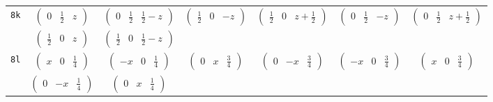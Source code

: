 \documentclass[fleqn,9pt,landscape]{jsarticle}
\begin{document}
\begin{center}
\begin{longtable}{ccccccc}
{\tt 8k} & $ \begin{pmatrix} 0 & \frac{1}{2} & z \end{pmatrix} $ & $ \begin{pmatrix} 0 & \frac{1}{2} & \frac{1}{2} - z \end{pmatrix} $ & $ \begin{pmatrix} \frac{1}{2} & 0 & - z \end{pmatrix} $ & $ \begin{pmatrix} \frac{1}{2} & 0 & z + \frac{1}{2} \end{pmatrix} $ & $ \begin{pmatrix} 0 & \frac{1}{2} & - z \end{pmatrix} $ & $ \begin{pmatrix} 0 & \frac{1}{2} & z + \frac{1}{2} \end{pmatrix} $ \\
& $ \begin{pmatrix} \frac{1}{2} & 0 & z \end{pmatrix} $ & $ \begin{pmatrix} \frac{1}{2} & 0 & \frac{1}{2} - z \end{pmatrix} $ & $  $ & $  $ & $  $ & $  $ \\ \hline
{\tt 8l} & $ \begin{pmatrix} x & 0 & \frac{1}{4} \end{pmatrix} $ & $ \begin{pmatrix} - x & 0 & \frac{1}{4} \end{pmatrix} $ & $ \begin{pmatrix} 0 & x & \frac{3}{4} \end{pmatrix} $ & $ \begin{pmatrix} 0 & - x & \frac{3}{4} \end{pmatrix} $ & $ \begin{pmatrix} - x & 0 & \frac{3}{4} \end{pmatrix} $ & $ \begin{pmatrix} x & 0 & \frac{3}{4} \end{pmatrix} $ \\
& $ \begin{pmatrix} 0 & - x & \frac{1}{4} \end{pmatrix} $ & $ \begin{pmatrix} 0 & x & \frac{1}{4} \end{pmatrix} $ & $  $ & $  $ & $  $ & $  $ \\ \hline

\end{longtable}
\end{center}
\end{document}
